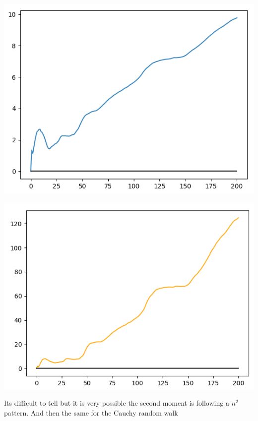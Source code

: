 \documentclass[12pt]{amsart}
\theoremstyle{definition}
\begin{document}
\begin{itemize}
\begin{enumerate}[label=(\alph*)]
\begin{enumerate}[label=(\alph*)]
    \includegraphics[scale=.5]{rw-hw2-gaussian-xbar.png}
    
    \includegraphics[scale=.5]{rw-hw2-gaussian-x2bar.png}

    Its difficult to tell but it is very possible the second moment is following a $n^2$ pattern. And then the same for the Cauchy random walk


\end{enumerate}
\end{enumerate}
\end{itemize}
\end{document}

